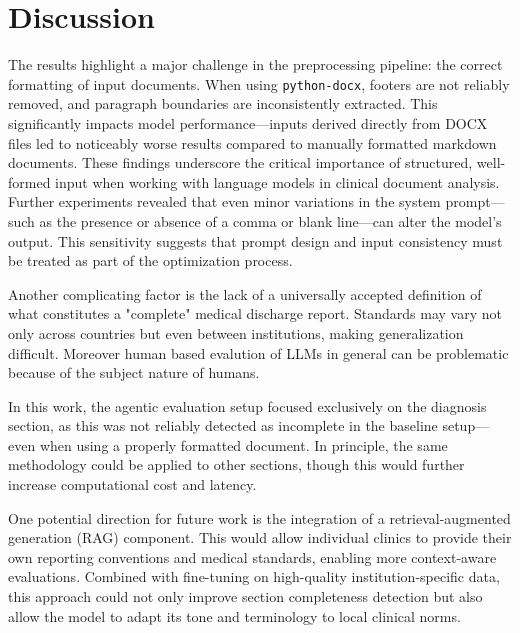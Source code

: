 \section{Discussion}

The results highlight a major challenge in the preprocessing pipeline: the
correct formatting of input documents. When using \texttt{python-docx}, footers
are not reliably removed, and paragraph boundaries are inconsistently
extracted. This significantly impacts model performance—inputs derived directly
from DOCX files led to noticeably worse results compared to manually formatted
markdown documents. These findings underscore the critical importance of
structured, well-formed input when working with language models in clinical
document analysis.\cite{p1}
Further experiments revealed that even minor variations in the system prompt—such as the presence or absence of a comma or blank line—can alter the model's output. This sensitivity suggests that prompt design and input consistency must be treated as part of the optimization process.

Another complicating factor is the lack of a universally accepted definition of
what constitutes a "complete" medical discharge report. Standards may vary not
only across countries but even between institutions, making generalization
difficult. Moreover human based evalution of LLMs in general can be problematic
because of the subject nature of humans.\cite{p2}

In this work, the agentic evaluation setup focused exclusively on the diagnosis section, as this was not reliably detected as incomplete in the baseline setup—even when using a properly formatted document. In principle, the same methodology could be applied to other sections, though this would further increase computational cost and latency.

One potential direction for future work is the integration of a retrieval-augmented generation (RAG) component. This would allow individual clinics to provide their own reporting conventions and medical standards, enabling more context-aware evaluations. Combined with fine-tuning on high-quality institution-specific data, this approach could not only improve section completeness detection but also allow the model to adapt its tone and terminology to local clinical norms.

